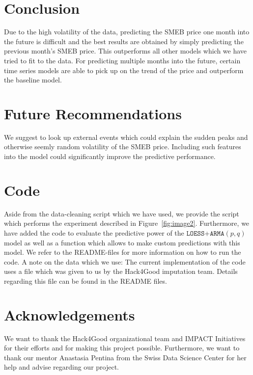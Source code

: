 \documentclass[11pt,a4paper]{article}
\begin{document}
	\section*{Conclusion}
	Due to the high volatility of the data, predicting the SMEB price one month into the future is difficult and the best results are obtained by simply predicting the previous month's SMEB price. This outperforms all other models which we have tried to fit to the data. For predicting multiple months into the future, certain time series models are able to pick up on the trend of the price and outperform the baseline model.
	
	\section*{Future Recommendations}
	We suggest to look up external events which could explain the sudden peaks and otherwise seemly random volatility of the SMEB price. Including such features into the model could significantly improve the predictive performance.
	
	\section*{Code}
	Aside from the data-cleaning script which we have used, we provide the script which performs the experiment described in Figure~\ref{fig:image2}. Furthermore, we have added the code to evaluate the predictive power of the $\mathtt{LOESS}$+$\mathtt{ARMA}(p,q)$ model as well as a function which allows to make custom predictions with this model. We refer to the README-files for more information on how to run the code. A note on the data which we use: The current implementation of the code uses a file which was given to us by the Hack4Good imputation team. Details regarding this file can be found in the README files.
	
	\section*{Acknowledgements}
	We want to thank the Hack4Good organizational team and IMPACT Initiatives for their efforts and for making this project possible. Furthermore, we want to thank our mentor Anastasia Pentina from the Swiss Data Science Center for her help and advise regarding our project.
\end{document}
